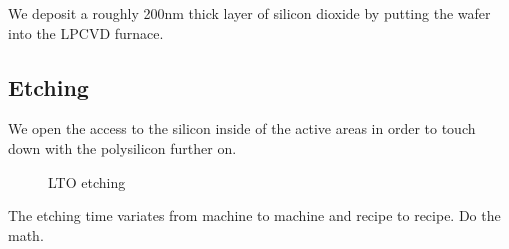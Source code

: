 We deposit a roughly 200nm thick layer of silicon dioxide by putting the wafer into the LPCVD furnace.

\subsection{Etching}\label{fox_etch}

We open the access to the silicon inside of the active areas in order to touch down with the polysilicon further on.

\begin{figure}[H]
	\centering
	\begin{tikzpicture}[node distance = 3cm, auto, thick,scale=\CrossSectionOnly, every node/.style={transform shape}]
		
	\end{tikzpicture}
	\drawStepArrow{}
	\begin{tikzpicture}[node distance = 3cm, auto, thick,scale=\CrossSectionOnly, every node/.style={transform shape}]
		
	\end{tikzpicture}
	\caption{LTO etching}
\end{figure}

The etching time variates from machine to machine and recipe to recipe. Do the math.
